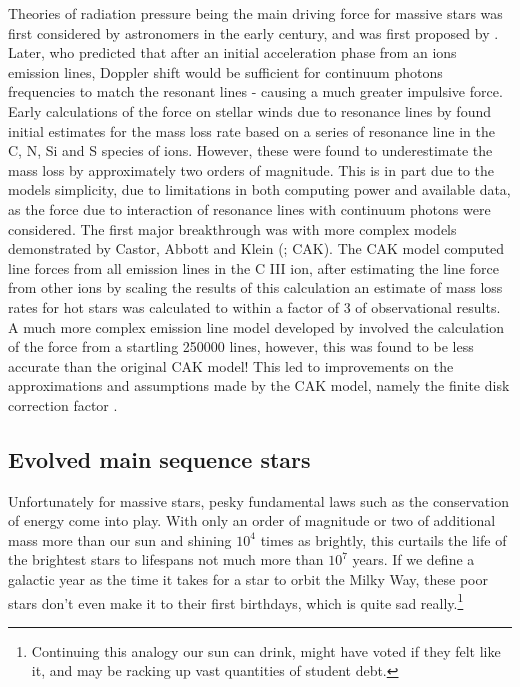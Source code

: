 Theories of radiation pressure being the main driving force for massive stars was first considered by astronomers in the early  century, and was first proposed by \textcite{sahaRadiationPressureQuantumTheory1919}.
Later, \textcite{milnePossibilityEmissionHighspeed1926} who predicted that after an initial acceleration phase from an ions emission lines, Doppler shift would be sufficient for continuum photons frequencies to match the resonant lines - causing a much greater impulsive force.
Early calculations of the force on stellar winds due to resonance lines by \textcite{lucy_mass_1970} found initial estimates for the mass loss rate based on a series of resonance line in the C, N, Si and S species of ions.
However, these were found to underestimate the mass loss by approximately two orders of magnitude.
This is in part due to the models simplicity, due to limitations in both computing power and available data, as the force due to interaction of resonance lines with continuum photons were considered.
The first major breakthrough was with more complex models demonstrated by Castor, Abbott and Klein (\citeyear{castor_radiation-driven_1975}; CAK).
The CAK model computed line forces from all emission lines in the C III ion, after estimating the line force from other ions by scaling the results of this calculation an estimate of mass loss rates for hot stars was calculated to within a factor of 3 of observational results.
A much more complex emission line model developed by \textcite{1982ApJ...259..282A} involved the calculation of the force from a startling \num{250000} lines, however, this was found to be less accurate than the original CAK model!
This led to improvements on the approximations and assumptions made by the CAK model, namely the finite disk correction factor
\parencite{friend_theory_1986,pauldrachRadiationdrivenWindsHot1986}.





\subsection{Evolved main sequence stars}

Unfortunately for massive stars, pesky fundamental laws such as the conservation of energy come into play. With only an order of magnitude or two of additional mass more than our sun and shining $10^4$ times as brightly, this curtails the life of the brightest stars to lifespans not much more than $10^7$ years.
If we define a galactic year as the time it takes for a star to orbit the Milky Way, these poor stars don't even make it to their first birthdays, which is quite sad really.\footnote{Continuing this analogy our sun can drink, might have voted if they felt like it, and may be racking up vast quantities of student debt.}

